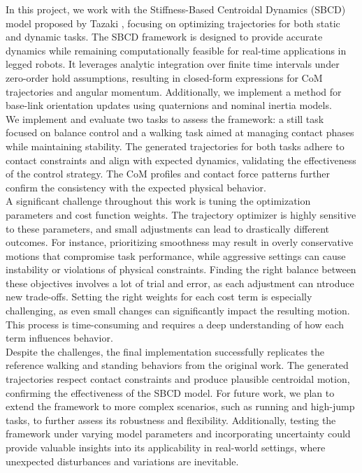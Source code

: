 \documentclass[main.tex]{subfiles}
\begin{document}
\begin{sloppypar}
In this project, we work with the Stiffness-Based Centroidal Dynamics (SBCD) model proposed by Tazaki \cite{tazaki2024trajectory}, focusing on optimizing trajectories for both static and dynamic tasks. The SBCD framework is designed to provide accurate dynamics while remaining computationally feasible for real-time applications in legged robots. It leverages analytic integration over finite time intervals under zero-order hold assumptions, resulting in closed-form expressions for CoM trajectories and angular momentum. Additionally, we implement a method for base-link orientation updates using quaternions and nominal inertia models. \\ 
We implement and evaluate two tasks to assess the framework: a still task focused on balance control and a walking task aimed at managing contact phases while maintaining stability. The generated trajectories for both tasks adhere to contact constraints and align with expected dynamics, validating the effectiveness of the control strategy. The CoM profiles and contact force patterns further confirm the consistency with the expected physical behavior. \\ 
A significant challenge throughout this work is tuning the optimization parameters and cost function weights. The trajectory optimizer is highly sensitive to these parameters, and small adjustments can lead to drastically different outcomes. For instance, prioritizing smoothness may result in overly conservative motions that compromise task performance, while aggressive settings can cause instability or violations of physical constraints. Finding the right balance between these objectives involves a lot of trial and error, as each adjustment can ntroduce new trade-offs. Setting the right weights for each cost term is especially challenging, as even small changes can significantly impact the resulting motion. This process is time-consuming and requires a deep understanding of how each term influences behavior. \\ 
Despite the challenges, the final implementation successfully replicates the reference walking and standing behaviors from the original work. The generated trajectories respect contact constraints and produce plausible centroidal motion, confirming the effectiveness of the SBCD model. For future work, we plan to extend the framework to more complex scenarios, such as running and high-jump tasks, to further assess its robustness and flexibility. Additionally, testing the framework under varying model parameters and incorporating uncertainty could provide valuable insights into its applicability in real-world settings, where unexpected disturbances and variations are inevitable.  



\end{sloppypar}
\end{document}
